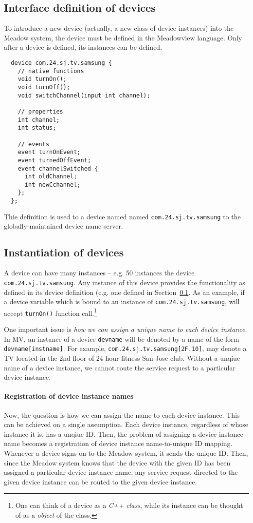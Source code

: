 \documentclass{myproc}
\begin{document}
\subsection{Interface definition of devices}\label{sec:devdef}
To introduce a new device (actually, a new class of device instances) into the
Meadow system, the device must be defined in the Meadowview language. Only
after a device is defined, its instances can be defined. 
\begin{verbatim}
  device com.24.sj.tv.samsung {
    // native functions
    void turnOn();
    void turnOff(); 
    void switchChannel(input int channel);

    // properties
    int channel;
    int status;
   
    // events
    event turnOnEvent;
    event turnedOffEvent;
    event channelSwitched { 
      int oldChannel; 
      int newCchannel;
    };
  };

\end{verbatim}
Thie definition is used to  a device named
named \verb+com.24.sj.tv.samsung+ to the globally-maintained device name
server.

\subsection{Instantiation of devices}
A device can have many instances -- e.g. 50 instances
the device \verb+com.24.sj.tv.samsung+.
Any instance of this device provides the functionality as defined 
in its device definition (e.g. one defined in Section~\ref{sec:devdef}.
As an example, if a device variable which is bound to an instance of
\verb+com.24.sj.tv.samsung+, will 
accept \verb+turnOn()+ function call.\footnote{One can think of a device as a
  {\em C++ class\/}, while its instance can be
thought of as a {\em object\/} of the class.}

One important issue is {\em how we can assign a unique name to each device
instance\/}. In MV, an instance of a device \verb+devname+ will be denoted by
a name of the form \verb+devname[instname]+.  For example,
\verb+com.24.sj.tv.samsung[2F.10]+, may denote a TV located in the 2nd 
floor of 24 hour fitness San Jose club. Without a unqiue name of a device
instance, we cannot route the service request to a particular device instance.

\paragraph{Registration of device instance names}
Now, the question is how we can assign the name to each device instance.
This can be achieved on a single assumption. Each device instance, regardless
of whose instance it is, has a unqiue ID. Then, the problem of assigning a
device instance name becomes a registration of device instance name-to-unique
ID mapping.  Whenever a device signs on to the Meadow system, it sends the
unique ID. Then, since the Meadow system knows that the device with the given
ID has been assigned a particular device instance name, any service request
directed to the given device instance can be routed to the given device
instance. 
\end{document}
